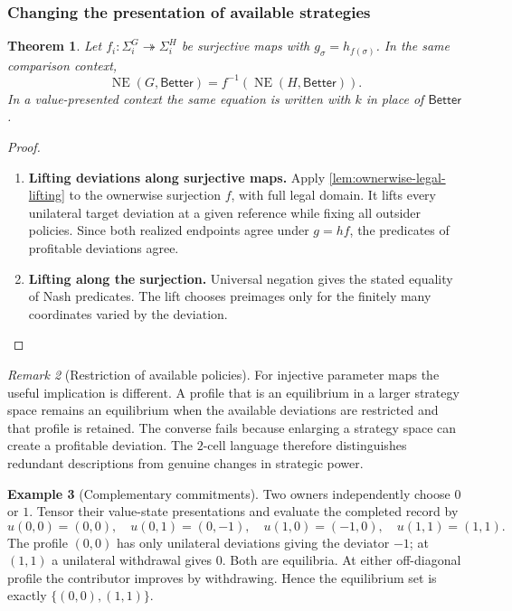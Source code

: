 \documentclass[11pt,a4paper]{article}
\numberwithin{equation}{section}
\newtheorem{theorem}{Theorem}[section]
\theoremstyle{definition}
\newtheorem{example}[theorem]{Example}
\theoremstyle{remark}
\newtheorem{remark}[theorem]{Remark}
\theoremstyle{plain}
\begin{document}
\subsubsection{Changing the presentation of available strategies}

\begin{theorem}
\label{thm:egt-surjection}
Let $f_i:\Sigma_i^G\twoheadrightarrow\Sigma_i^H$ be surjective maps with
$g_\sigma=h_{f(\sigma)}$. In the same comparison context,
\[
 \operatorname{NE}(G,\mathsf{Better})
 =f^{-1}(\operatorname{NE}(H,\mathsf{Better})).
\]
In a value-presented context the same equation is written with $k$ in place
of $\mathsf{Better}$.
\end{theorem}
\begin{proof}
\leavevmode
\begin{enumerate}[label=\textup{(\arabic*)},leftmargin=*,itemsep=4pt,topsep=3pt]
  \item \textbf{Lifting deviations along surjective maps.} Apply \cref{lem:ownerwise-legal-lifting} to the ownerwise surjection
$f$, with full legal domain. It lifts every unilateral target deviation
at a given reference while fixing all outsider policies. Since both
realized endpoints agree under $g=h f$, the predicates of profitable
deviations agree.
  \item \textbf{Lifting along the surjection.} Universal negation gives the stated equality of Nash
predicates. The lift chooses preimages only for the finitely many coordinates varied by the deviation.
\end{enumerate}
\end{proof}

\begin{remark}[Restriction of available policies]
For injective parameter maps the useful implication is different. A profile
that is an equilibrium in a larger strategy space remains an equilibrium
when the available deviations are restricted and that profile is retained.
The converse fails because enlarging a strategy space can create a profitable
deviation. The $2$-cell language therefore distinguishes redundant
descriptions from genuine changes in strategic power.
\end{remark}

\begin{example}[Complementary commitments]
\label{ex:egt-commitments}
Two owners independently choose $0$ or $1$. Tensor their value-state
presentations and evaluate the completed record by
\[
 u(0,0)=(0,0),\quad u(0,1)=(0,-1),\quad
 u(1,0)=(-1,0),\quad u(1,1)=(1,1).
\]
The profile $(0,0)$ has only unilateral deviations giving the deviator
$-1$; at $(1,1)$ a unilateral withdrawal gives $0$. Both are equilibria.
At either off-diagonal profile the contributor improves by withdrawing.
Hence the equilibrium set is exactly $\{(0,0),(1,1)\}$.
\end{example}
\end{document}
